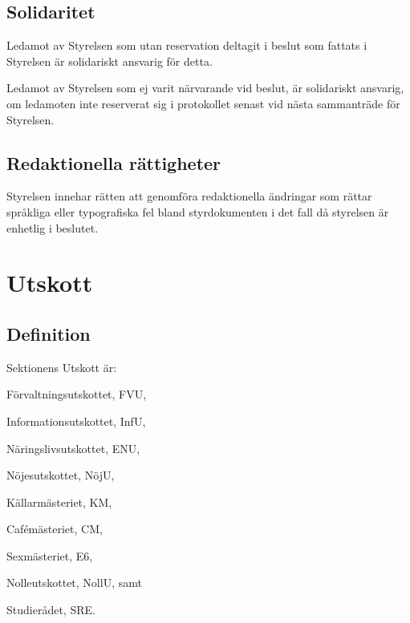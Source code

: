 \documentclass[10pt]{article}
\begin{document}
    
    \subsection{Solidaritet}
    Ledamot av Styrelsen som utan reservation deltagit i beslut som fattats i
    Styrelsen är solidariskt ansvarig för detta.
    
    Ledamot av Styrelsen som ej varit närvarande vid beslut, är solidariskt
    ansvarig, om ledamoten inte reserverat sig i protokollet senast vid nästa
    sammanträde för Styrelsen.


    \subsection{Redaktionella rättigheter}

    Styrelsen innehar rätten att genomföra redaktionella ändringar som rättar språkliga eller typografiska fel bland styrdokumenten i det fall då styrelsen är enhetlig i beslutet. 

    \newpage
    
    \section{Utskott}
    \subsection{Definition}
    Sektionens Utskott är:
    \begin{alphlist}
    \item Förvaltningsutskottet, FVU,
    \item Informationsutskottet, InfU,
    \item Näringslivsutskottet, ENU,
    \item Nöjesutskottet, NöjU,
    \item Källarmästeriet, KM,
    \item Cafémästeriet, CM,
    \item Sexmästeriet, E6,
    \item Nolleutskottet, NollU, samt
    \item Studierådet, SRE.
    \end{alphlist}
    
\end{document}
